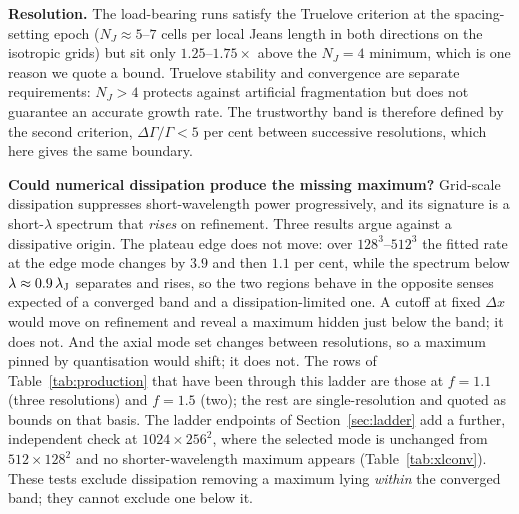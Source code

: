 \documentclass[usenatbib,twoside,twocolumn]{mnras}
\begin{document}
\smallskip\noindent\textbf{Resolution.} The load-bearing runs satisfy the Truelove criterion at the spacing-setting epoch ($N_J\approx5$--$7$ cells per local Jeans length in both directions on the isotropic grids) but sit only $1.25$--$1.75\times$ above the $N_J=4$ minimum, which is one reason we quote a bound. Truelove stability and convergence are separate requirements: $N_J>4$ protects against artificial fragmentation but does not guarantee an accurate growth rate. The trustworthy band is therefore defined by the second criterion, $\Delta\Gamma/\Gamma<5$ per cent between successive resolutions, which here gives the same boundary.

\smallskip\noindent\textbf{Could numerical dissipation produce the missing maximum?} Grid-scale dissipation suppresses short-wavelength power progressively, and its signature is a short-$\lambda$ spectrum that \emph{rises} on refinement. Three results argue against a dissipative origin. The plateau edge does not move: over $128^3$--$512^3$ the fitted rate at the edge mode changes by $3.9$ and then $1.1$ per cent, while the spectrum below $\lambda\approx0.9\,\lambda_{\rm J}$ separates and rises, so the two regions behave in the opposite senses expected of a converged band and a dissipation-limited one. A cutoff at fixed $\Delta x$ would move on refinement and reveal a maximum hidden just below the band; it does not. And the axial mode set changes between resolutions, so a maximum pinned by quantisation would shift; it does not. The rows of Table~\ref{tab:production} that have been through this ladder are those at $f=1.1$ (three resolutions) and $f=1.5$ (two); the rest are single-resolution and quoted as bounds on that basis. The ladder endpoints of Section~\ref{sec:ladder} add a further, independent check at $1024\times256^2$, where the selected mode is unchanged from $512\times128^2$ and no shorter-wavelength maximum appears (Table~\ref{tab:xlconv}). These tests exclude dissipation removing a maximum lying \emph{within} the converged band; they cannot exclude one below it.
\end{document}
